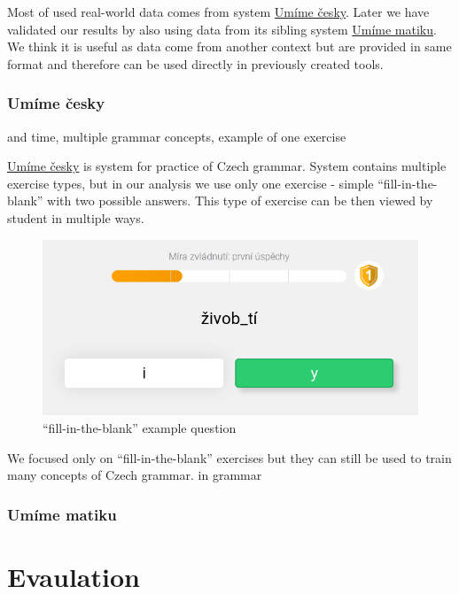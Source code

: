 \documentclass[
  digital, %
  table,   %
  nolof,     %
  nolot,     %
  nocover
]{fithesis3}
\begin{document}
Most of used real-world data comes from system
\href{https://umimecesky.cz/}{Umíme česky}. Later we have validated our
results by also using data from its sibling system
\href{https://umimematiku.cz/}{Umíme matiku}. We think it is useful as
data come from another context but are provided in same format and
therefore can be used directly in previously created tools.

\subsubsection{Umíme česky}\label{umuxedme-ux10desky}

and time, multiple grammar concepts, example of one exercise

\href{https://umimecesky.cz/}{Umíme česky} is system for practice of
Czech grammar. System contains multiple exercise types, but in our
analysis we use only one exercise - simple ``fill-in-the-blank'' with
two possible answers. This type of exercise can be then viewed by
student in multiple ways. %

\begin{figure}
\centering
\includegraphics{img/umimecesky_doplnovacka}
\caption{``fill-in-the-blank'' example question}
\end{figure}

We focused only on ``fill-in-the-blank'' exercises but they can still be
used to train many concepts of Czech grammar. %
in grammar

\subsubsection{Umíme matiku}\label{umuxedme-matiku}

\section{Evaulation}\label{evaulation}
\end{document}
